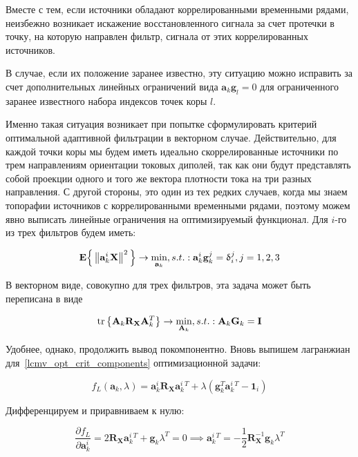 Вместе с тем, если источники обладают коррелированными временными рядами, неизбежно возникает искажение
восстановленного сигнала за счет протечки в точку, на которую направлен фильтр, сигнала от
этих коррелированных источников.

В случае, если их положение заранее известно, эту ситуацию можно исправить за счет дополнительных
линейных ограничений вида $\mathbf{a}_k \mathbf{g}_l=0$ для ограниченного заранее известного
набора индексов точек коры $l$.

Именно такая ситуация возникает при попытке сформулировать критерий оптимальной
адаптивной фильтрации в векторном случае. Действительно, для каждой точки коры мы будем
иметь идеально скоррелированные источники по трем направлениям ориентации токовых диполей,
так как они будут представлять собой проекции одного и того же вектора плотности тока на три разных
направления. С другой стороны, это один из тех редких случаев, когда мы знаем топорафии
источников с коррелированными временными рядами, поэтому можем явно выписать линейные ограничения
на оптимизируемый функционал. Для $i$-го из трех фильтров будем иметь:

\begin{equation}
    \mathbf{E}\Big\{\left\lVert\mathbf{a}_k^i \mathbf{X}\right\rVert^2\Big\}
    \rightarrow \underset{\mathbf{a}_k}{\min},
    s.t.: \mathbf{a}_k^i \mathbf{g}_k^j =  \updelta_i^j, j = 1,2,3
    \label{lcmv_opt_crit_components}
\end{equation}

В векторном виде, совокупно для трех фильтров, эта задача может быть переписана в виде


\begin{equation}
    \operatorname{tr}\left\{
        \mathbf{A}_k \mathbf{R}_\mathbf{X}\mathbf{A}_k^T
    \right\} \rightarrow \underset{\mathbf{A}_k}{\min},
    s.t.: \mathbf{A}_k \mathbf{G}_k =  \mathbf{I}
    \label{lcmv_opt_criterion_vec}
\end{equation}

Удобнее, однако, продолжить вывод покомпонентно.
Вновь выпишем лагранжиан для~\ref{lcmv_opt_crit_components} оптимизационной задачи:

\begin{equation}
    f_L(\mathbf{a}_k, \lambda) = \mathbf{a}_k^i \mathbf{R}_\mathbf{X} \mathbf{a}_k^i^T +
    \lambda (\mathbf{g}_k^T \mathbf{a}_k^i^T - \mathbf{1}_i)
\end{equation}

Дифференцируем и приравниваем к нулю:

\begin{equation}
    \frac{\partial f_L}{\partial \mathbf{a}_k^i} =
    2 \mathbf{R}_\mathbf{X} \mathbf{a}_k^i^T + \mathbf{g}_k \lambda^T = 0 \implies
    \mathbf{a}_k^i^T = - \frac{1}{2}\mathbf{R}_\mathbf{X}^{-1} \mathbf{g}_k \lambda^T
\end{equation}

